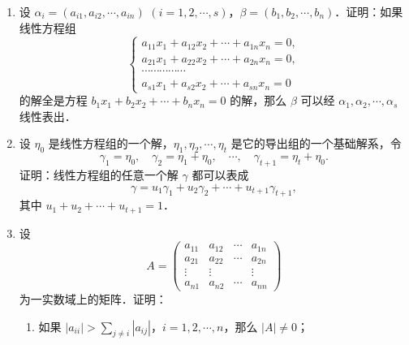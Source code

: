 \begin{enumerate}
\[\begin{cases}
    \end{cases}
  \]
  的系数矩阵为
  \[
    A=\begin{pmatrix}
      a_{11}&a_{12}&\cdots&a_{1n}\\
      a_{21}&a_{22}&\cdots&a_{2n}\\
      \vdots&\vdots&&\vdots\\
      a_{n-1,1}&a_{n-1,2}&\cdots&a_{n-1,n}
    \end{pmatrix},
  \]
  设 $M_i$ 是矩阵 $A$ 中划去第 $i$ 列剩下的 $(n-1)\times(n-1)$ 矩阵的行列式．证明：
  \begin{enumerate}
    \item $(M_1,-M_2,\cdots,(-1)^{n-1}M_n)$ 是方程组的一个解；
  \anssub
    \item 如果 $A$ 的秩为 $n-1$，那么方程组的解全是 $(M_1,-M_2,\cdots,(-1)^{n-1}M_n)$ 的倍数．
  \anssub
  \end{enumerate}
  \item 设 $\alpha_i=(a_{i1},a_{i2},\cdots,a_{in})$ $(i=1,2,\cdots,s)$，$\beta=(b_1,b_2,\cdots,b_n)$．证明：如果线性方程组
  \[
    \begin{cases}
      a_{11}x_1+a_{12}x_2+\cdots+a_{1n}x_n=0,\\
      a_{21}x_1+a_{22}x_2+\cdots+a_{2n}x_n=0,\\
      \cdots\cdots\cdots\cdots\cdots\\
      a_{s1}x_1+a_{s2}x_2+\cdots+a_{sn}x_n=0
    \end{cases}
  \]
  的解全是方程 $b_1x_1+b_2x_2+\cdots+b_nx_n=0$ 的解，那么 $\beta$ 可以经 $\alpha_1,\alpha_2,\cdots,\alpha_s$ 线性表出．
  \ansproof
  \item 设 $\eta_0$ 是线性方程组的一个解，$\eta_1,\eta_2,\cdots,\eta_t$ 是它的导出组的一个基础解系，令
  \[
    \gamma_1=\eta_0,\quad\gamma_2=\eta_1+\eta_0,\quad\cdots,\quad\gamma_{t+1}=\eta_t+\eta_0.
  \]
  证明：线性方程组的任意一个解 $\gamma$ 都可以表成
  \[
    \gamma=u_1\gamma_1+u_2\gamma_2+\cdots+u_{t+1}\gamma_{t+1},
  \]
  其中 $u_1+u_2+\cdots+u_{t+1}=1$．
  \ansproof
  \item 设
  \[
    A=\begin{pmatrix}
      a_{11}&a_{12}&\cdots&a_{1n}\\
      a_{21}&a_{22}&\cdots&a_{2n}\\
      \vdots&\vdots&&\vdots\\
      a_{n1}&a_{n2}&\cdots&a_{nn}
    \end{pmatrix}
  \]
  为一实数域上的矩阵．证明：
  \begin{enumerate}
    \item 如果 $|a_{ii}|>\sum\limits_{j\ne i}|a_{ij}|$，$i=1,2,\cdots,n$，那么 $|A|\ne 0$；

\end{enumerate}
\end{enumerate}
